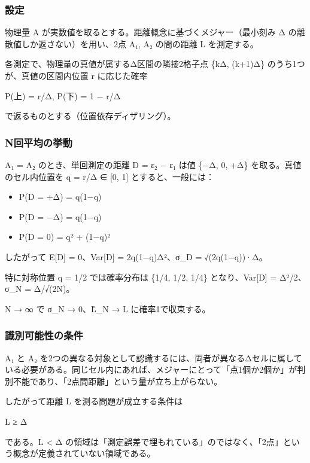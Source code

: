 \documentclass[
  11pt,
]{ltjsarticle}
\providecommand{\tightlist}{%
  \setlength{\itemsep}{0pt}\setlength{\parskip}{0pt}}
\begin{document}
\subsubsection{設定}\label{ux8a2dux5b9a}

物理量 A が実数値を取るとする。距離概念に基づくメジャー（最小刻み Δ
の離散値しか返さない）を用い、2点 A₁, A₂ の間の距離 L を測定する。

各測定で、物理量の真値が属するΔ区間の隣接2格子点 \{kΔ, (k+1)Δ\}
のうち1つが、真値の区間内位置 r に応じた確率

P(上) = r/Δ, P(下) = 1 − r/Δ

で返るものとする（位置依存ディザリング）。

\subsubsection{N回平均の挙動}\label{nux56deux5e73ux5747ux306eux6319ux52d5}

A₁ = A₂ のとき、単回測定の距離 D = ε₂ − ε₁ は値 \{−Δ, 0, +Δ\}
を取る。真値のセル内位置を q = r/Δ ∈ {[}0, 1{]} とすると、一般には：

\begin{itemize}
\tightlist
\item
  P(D = +Δ) = q(1−q)
\item
  P(D = −Δ) = q(1−q)
\item
  P(D = 0) = q² + (1−q)²
\end{itemize}

したがって E{[}D{]} = 0、Var{[}D{]} = 2q(1−q)Δ²、σ\_D = √(2q(1−q))·Δ。

特に対称位置 q = 1/2 では確率分布は \{1/4, 1/2, 1/4\} となり、Var{[}D{]}
= Δ²/2、σ\_N = Δ/√(2N)。

N → ∞ で σ\_N → 0、L̂\_N → L に確率1で収束する。

\subsubsection{識別可能性の条件}\label{ux8b58ux5225ux53efux80fdux6027ux306eux6761ux4ef6}

A₁ と A₂
を2つの異なる対象として認識するには、両者が異なるΔセルに属している必要がある。同じセル内にあれば、メジャーにとって「点1個か2個か」が判別不能であり、「2点間距離」という量が立ち上がらない。

したがって距離 L を測る問題が成立する条件は

L ≥ Δ

である。L \textless{} Δ
の領域は「測定誤差で埋もれている」のではなく、「2点」という概念が定義されていない領域である。
\end{document}
